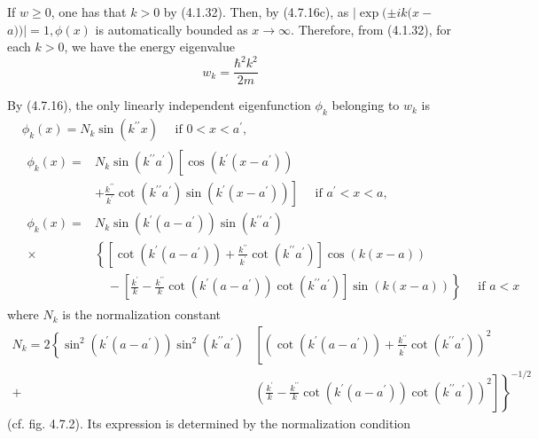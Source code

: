 \documentclass{article}
\begin{document}
If $w \geq 0$, one has that $k>0$ by (4.1.32). Then, by (4.7.16c), as $\mid \exp ( \pm i k(x-$ $a)) \mid=1, \phi(x)$ is automatically bounded as $x \rightarrow \infty$. Therefore, from (4.1.32), for each $k>0$, we have the energy eigenvalue
$$
\begin{equation*}
w_{k}=\frac{\hbar^{2} k^{2}}{2 m} \tag{4.7.17}
\end{equation*}
$$

By (4.7.16), the only linearly independent eigenfunction $\phi_{k}$ belonging to $w_{k}$ is
$$
\begin{align*}
& \phi_{k}(x)=N_{k} \sin \left(k^{\prime \prime} x\right) \quad \text { if } 0<x<a^{\prime},  \tag{4.7.18a}\\
& \begin{align*}
\phi_{k}(x)= & N_{k} \sin \left(k^{\prime \prime} a^{\prime}\right)\left[\cos \left(k^{\prime}\left(x-a^{\prime}\right)\right)\right. \\
& \left.+\frac{k^{\prime \prime}}{k^{\prime}} \cot \left(k^{\prime \prime} a^{\prime}\right) \sin \left(k^{\prime}\left(x-a^{\prime}\right)\right)\right] \quad \text { if } a^{\prime}<x<a, \\
\phi_{k}(x)= & N_{k} \sin \left(k^{\prime}\left(a-a^{\prime}\right)\right) \sin \left(k^{\prime \prime} a^{\prime}\right) \\
\times & \left\{\left[\cot \left(k^{\prime}\left(a-a^{\prime}\right)\right)+\frac{k^{\prime \prime}}{k^{\prime}} \cot \left(k^{\prime \prime} a^{\prime}\right)\right] \cos (k(x-a))\right. \\
& \left.\quad-\left[\frac{k^{\prime}}{k}-\frac{k^{\prime \prime}}{k} \cot \left(k^{\prime}\left(a-a^{\prime}\right)\right) \cot \left(k^{\prime \prime} a^{\prime}\right)\right] \sin (k(x-a))\right\} \quad \text { if } a<x
\end{align*} \tag{4.7.18b}
\end{align*}
$$
where $N_{k}$ is the normalization constant
$$
\begin{align*}
N_{k}=2\left\{\sin ^{2}\left(k^{\prime}\left(a-a^{\prime}\right)\right) \sin ^{2}\left(k^{\prime \prime} a^{\prime}\right)\right. & {\left[\left(\cot \left(k^{\prime}\left(a-a^{\prime}\right)\right)+\frac{k^{\prime \prime}}{k^{\prime}} \cot \left(k^{\prime \prime} a^{\prime}\right)\right)^{2}\right.}  \tag{4.7.19}\\
+ & \left.\left.\left(\frac{k^{\prime}}{k}-\frac{k^{\prime \prime}}{k} \cot \left(k^{\prime}\left(a-a^{\prime}\right)\right) \cot \left(k^{\prime \prime} a^{\prime}\right)\right)^{2}\right]\right\}^{-1 / 2}
\end{align*}
$$
(cf. fig. 4.7.2). Its expression is determined by the normalization condition
\end{document}
